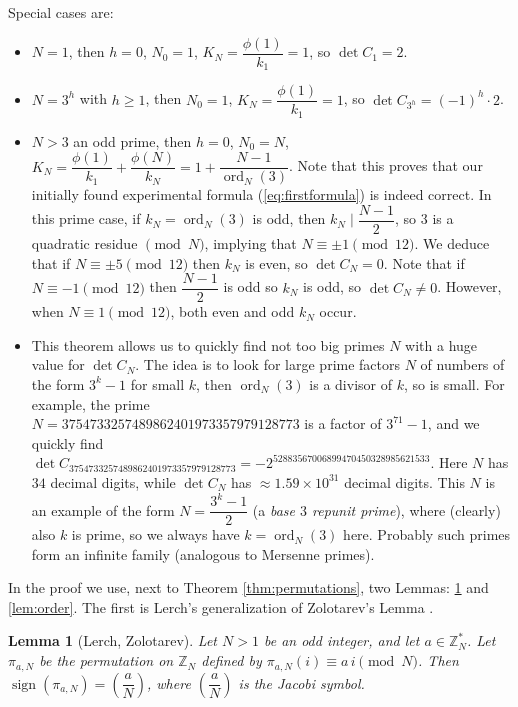 \documentclass[10pt]{article}
\newtheorem{lemma}{Lemma}
\theoremstyle{definition}
\newcommand{\qmod}[1]{\!\!\!\pmod{#1}}
\newcommand{\Z}{\mathbb{Z}}
\newcommand{\jacobi}[2]{\displaystyle\left(\dfrac{#1}{#2}\right)}
\DeclareMathOperator{\ord}{ord}
\DeclareMathOperator{\sign}{sign}
\begin{document}
Special cases are:
\begin{itemize} \setlength{\itemsep}{0pt}
    \item $ N = 1 $, then $ h = 0 $, $ N_0 = 1 $, $ K_N = \dfrac{\phi(1)}{k_1} = 1 $, so $ \det C_1 = 2 $.
    \item $ N = 3^h $ with $ h \geq 1 $, then $ N_0 = 1 $, $ K_N = \dfrac{\phi(1)}{k_1} = 1 $, so
    $ \det C_{3^h} = (-1)^h \cdot 2 $.
    \item $ N > 3 $ an odd prime, then $ h = 0 $, $ N_0 = N $,
    $ K_N = \dfrac{\phi(1)}{k_1} + \dfrac{\phi(N)}{k_N} = 1 + \dfrac{N-1}{\ord_N(3)} $. Note that this
    proves that our initially found experimental formula (\ref{eq:firstformula}) is indeed correct. In
    this prime case, if $ k_N = \ord_N(3) $ is odd, then $ k_N \mid \dfrac{N-1}{2} $, so $ 3 $ is a
    quadratic residue $ \qmod{N} $, implying that $ N \equiv \pm 1 \pmod{12} $. We deduce that if
    $ N \equiv \pm 5 \pmod{12} $ then $ k_N $ is even, so $ \det C_N = 0 $. Note that if
    $ N \equiv -1 \pmod{12} $ then $ \dfrac{N-1}{2} $ is odd so $ k_N $ is odd, so $ \det C_N \neq 0 $.
    However, when $ N \equiv 1 \pmod{12} $, both even and odd $ k_N $ occur.
    \item This theorem allows us to quickly find not too big primes $ N $ with a huge value for $ \det C_N $.
    The idea is to look for large prime factors $ N $ of numbers of the form $ 3^k - 1 $ for small
    $ k $, then $ \ord_N(3) $ is a divisor of $ k $, so is small. For example, the prime \\
    $ N = 3754733257489862401973357979128773 $ is a factor of $ 3^{71} - 1 $, and we quickly find \\
    $ \det C_{3754733257489862401973357979128773} = -2^{52883567006899470450328985621533} $. Here
    $ N $ has $ 34 $ decimal digits, while $ \det C_N $ has $ \approx 1.59 \times 10^{31} $ decimal
    digits. This $ N $ is an example of the form $ N = \dfrac{3^k-1}{2} $ (a \emph{base $ 3 $ repunit
        prime}), where (clearly) also $ k $ is prime, so we always have $ k = \ord_N(3) $ here. Probably
    such primes form an infinite family (analogous to Mersenne primes).
\end{itemize}

In the proof we use, next to Theorem \ref{thm:permutations}, two Lemmas: \ref{lem:zolotarev} and
\ref{lem:order}. The first is Lerch's generalization \cite{L} of Zolotarev's Lemma \cite{Z}.

\begin{lemma}[Lerch, Zolotarev] \label{lem:zolotarev}
    Let $ N > 1 $ be an odd integer, and let $ a \in \Z_N^{\ast} $. Let $ \pi_{a,N} $ be the permutation on
    $ \Z_N $ defined by $ \pi_{a,N}(i) \equiv a \, i \pmod{N} $. Then
    $ \sign(\pi_{a,N}) = \jacobi{a}{N} $, where $ \jacobi{a}{N} $ is the Jacobi symbol.
\end{lemma}
\end{document}
